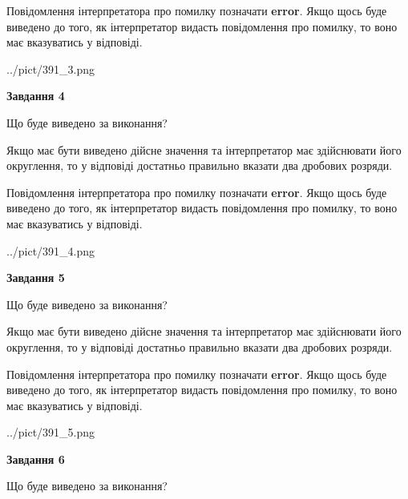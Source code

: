 \documentclass[12pt, ukrainian]{article}
\begin{document}
{\begin {Large}
Повідомлення інтерпретатора про помилку позначати \textbf{error}.
Якщо щось буде виведено до того, як інтерпретатор видасть повідомлення про помилку, 
то воно має вказуватись у відповіді. \par

\begin{center}
	{../pict/391_3.png}
\end{center}
\newpage

{\begin {center}\textbf{Завдання 4}\end {center}}\par
Що буде виведено за виконання? \par

Якщо має бути виведено дійсне значення та інтерпретатор має здійснювати його округлення, 
то у відповіді достатньо правильно вказати два дробових розряди.

Повідомлення інтерпретатора про помилку позначати \textbf{error}.
Якщо щось буде виведено до того, як інтерпретатор видасть повідомлення про помилку, 
то воно має вказуватись у відповіді. \par

\begin{center}
	{../pict/391_4.png}
\end{center}
\newpage

{\begin {center}\textbf{Завдання 5}\end {center}}\par
Що буде виведено за виконання? \par

Якщо має бути виведено дійсне значення та інтерпретатор має здійснювати його округлення, 
то у відповіді достатньо правильно вказати два дробових розряди.

Повідомлення інтерпретатора про помилку позначати \textbf{error}.
Якщо щось буде виведено до того, як інтерпретатор видасть повідомлення про помилку, 
то воно має вказуватись у відповіді. \par

\begin{center}
	{../pict/391_5.png}
\end{center}
\newpage

{\begin {center}\textbf{Завдання 6}\end {center}}\par
Що буде виведено за виконання? \par


\end{Large}}
\end{document}
